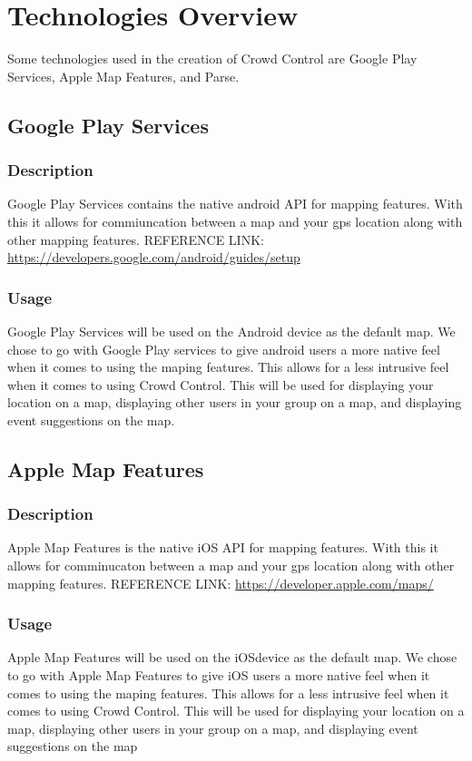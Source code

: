 \section{Technologies Overview}
Some technologies used in the creation of Crowd Control are Google Play Services, Apple Map Features, and Parse.

\subsection{Google Play Services}
	\subsubsection{Description}
	Google Play Services contains the native android API for mapping features. With this it allows for commiuncation between a map and your gps location along with other mapping features.
\newline
REFERENCE LINK:  \url{https://developers.google.com/android/guides/setup}
	\subsubsection{Usage}
	Google Play Services will be used on the Android device as the default map. We chose to go with Google Play services to give android users a more native feel when it comes to using the maping features. This allows for a less intrusive feel when it comes to using Crowd Control. This will be used for displaying your location on a map, displaying other users in your group on a map, and displaying event suggestions on the map.

\subsection{Apple Map Features}
	\subsubsection{Description}
	Apple Map Features is the native iOS API for mapping features. With this it allows for comminucaton between a map and your gps location along with other mapping features.
\newline
REFERENCE LINK: \url{https://developer.apple.com/maps/}
	\subsubsection{Usage}
Apple Map Features will be used on the iOSdevice as the default map. We chose to go with Apple Map Features to give iOS users a more native feel when it comes to using the maping features. This allows for a less intrusive feel when it comes to using Crowd Control. This will be used for displaying your location on a map, displaying other users in your group on a map, and displaying event suggestions on the map

